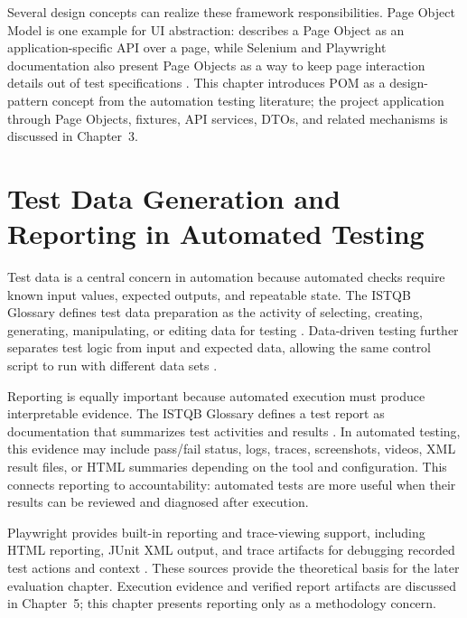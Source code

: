 Several design concepts can realize these framework responsibilities. Page Object Model is one example for UI abstraction: \textcite{fowler_page_object_2013} describes a Page Object as an application-specific API over a page, while Selenium and Playwright documentation also present Page Objects as a way to keep page interaction details out of test specifications \autocite{selenium_page_object_models_2026,playwright_docs_pom_2026}. This chapter introduces POM as a design-pattern concept from the automation testing literature; the project application through Page Objects, fixtures, API services, DTOs, and related mechanisms is discussed in Chapter~3.

\section{Test Data Generation and Reporting in Automated Testing}
\label{sec:ch2-test-data-reporting}

Test data is a central concern in automation because automated checks require known input values, expected outputs, and repeatable state. The ISTQB Glossary defines test data preparation as the activity of selecting, creating, generating, manipulating, or editing data for testing \autocite{istqb_glossary_test_data_preparation_2026}. Data-driven testing further separates test logic from input and expected data, allowing the same control script to run with different data sets \autocite{istqb_glossary_data_driven_testing_2026,microsoft_data_driven_testing_2021}.

Reporting is equally important because automated execution must produce interpretable evidence. The ISTQB Glossary defines a test report as documentation that summarizes test activities and results \autocite{istqb_glossary_test_report_2026}. In automated testing, this evidence may include pass/fail status, logs, traces, screenshots, videos, XML result files, or HTML summaries depending on the tool and configuration. This connects reporting to accountability: automated tests are more useful when their results can be reviewed and diagnosed after execution.

Playwright provides built-in reporting and trace-viewing support, including HTML reporting, JUnit XML output, and trace artifacts for debugging recorded test actions and context \autocite{playwright_docs_reporters_2026,playwright_docs_trace_viewer_2026}. These sources provide the theoretical basis for the later evaluation chapter. Execution evidence and verified report artifacts are discussed in Chapter~5; this chapter presents reporting only as a methodology concern.
